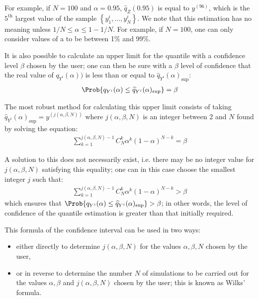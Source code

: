 {  For example, if  $N=100$ and  $\alpha = 0.95$, $\widehat{q}_Z(0.95)$  is equal to  $y^{(96)}$, which is the $5^\textrm{th}$ largest value of the sample $\left\{ y^i_1,\ldots,y^i_N \right\}$. We note that this estimation has no meaning unless $1/N \leq \alpha \leq 1-1/N$. For example, if $N=100$, one can only consider values of a to be between 1\% and 99\%. \vspace{2mm}

  It is also possible to calculate an upper limit for the quantile with a confidence level $\beta$ chosen by the user; one can then  be sure with a $\beta$ level of confidence that the real value of $q_{Y^i}(\alpha))$ is less than or equal to $\widehat{q}_{Y^i}(\alpha)_{\sup}$:
  \begin{align*}
    \Prob{q_{Y^i}(\alpha) \leq \widehat{q}_{Y^i}(\alpha)_{\sup}} = \beta
  \end{align*}

  The most robust method for calculating this upper limit consists of taking $\widehat{q}_{Y^i}(\alpha)_{\sup} = y^{(j(\alpha,\beta,N))}$  where $j(\alpha,\beta,N)$ is an integer between 2 and $N$ found by solving the equation:
  \begin{align*}
    \sum_{k=1}^{j(\alpha,\beta,N) - 1} C^k_N \alpha^k \left( 1-\alpha \right)^{N-k} = \beta
  \end{align*}

  A solution to this does not necessarily exist, i.e. there may be no integer value for $j(\alpha,\beta,N)$ satisfying this equality; one can in this case choose the smallest integer $j$ such that:
  \begin{align*}
    \sum_{k=1}^{j(\alpha,\beta,N) - 1} C^k_N \alpha^k \left( 1-\alpha \right)^{N-k} > \beta
  \end{align*}
  which ensures that  $\Prob{q_{Y^i}(\alpha) \leq \widehat{q}_{Y^i}(\alpha)_{\sup}} > \beta$; in other words,  the level of confidence of the quantile estimation is greater than that initially required.

  This formula of the confidence interval can be used in two ways:
  \begin{itemize}
  \item either directly to determine $j(\alpha,\beta,N)$ for the values $\alpha,\beta,N$ chosen by the user,
  \item or in reverse to determine the number $N$ of simulations to be carried out for the values $\alpha,\beta$ and $j(\alpha,\beta,N)$ chosen by the user; this is known as Wilks' formula.
  \end{itemize}

}
